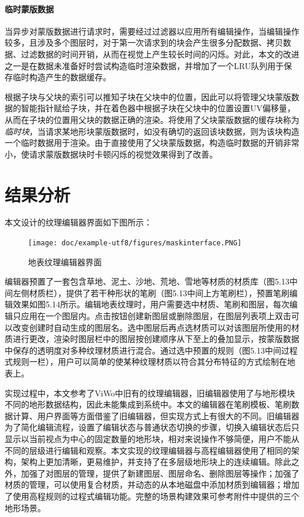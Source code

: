 \paragraph{临时蒙版数据}
当异步对蒙版数据进行请求时，需要经过过滤器以应用所有编辑操作，当编辑操作较多，且涉及多个图层时，对于第一次请求到的块会产生很多分配数据、拷贝数据、过滤数据的时间开销，从而在视觉上产生较长时间的闪烁。对此，本文的改进之一是在数据未准备好时尝试构造临时渲染数据，并增加了一个LRU队列用于保存临时构造产生的数据缓存。\par
根据子块与父块的索引可以推知子块在父块中的位置，因此可以将管理父块蒙版数据的智能指针赋给子块，并在着色器中根据子块在父块中的位置设置UV偏移量，从而在子块的位置用父块的数据正确的渲染。将使用了父块蒙版数据的缓存块称为\textit{临时块}，当请求某地形块蒙版数据时，如没有确切的返回该块数据，则为该块构造一个临时数据用于渲染。由于直接使用了父块蒙版数据，构造临时数据的开销非常小，使请求蒙版数据块时卡顿闪烁的视觉效果得到了改善。

\section{结果分析}
本文设计的纹理编辑器界面如下图所示：\par
\begin{figure}[htb]
    \centering
    \texttt{[image: doc/example-utf8/figures/maskinterface.PNG]}
  \caption{地表纹理编辑器界面}
  \end{figure}
编辑器预置了一套包含草地、泥土、沙地、荒地、雪地等材质的材质库（图5.13中间左侧材质栏），提供了若干种形状的笔刷（图5.13中间上方笔刷栏），预置笔刷编辑效果如图5.14所示。编辑地表纹理时，用户需要选中材质、笔刷和图层，每次编辑只应用在一个图层内。点击按钮创建新图层或删除图层，在图层列表项上双击可以改变创建时自动生成的图层名。选中图层后再点选材质可以对该图层所使用的材质进行更改，渲染时图层栏中的图层按创建顺序从下至上的叠加显示，按蒙版数据中保存的透明度对多种纹理材质进行混合。通过选中预置的规则（图5.13中间过程式规则一栏），用户可以简单的使某种纹理材质以符合其分布特征的方式绘制在地表上。\par
实现过程中，本文参考了ViWo中旧有的纹理编辑器，旧编辑器使用了与地形模块不同的地形数据结构，因此未能集成到系统中。本文的编辑器在笔刷模板、笔刷数据计算、用户界面等方面借鉴了旧编辑器，但实现方式上有很大的不同。旧编辑器为了简化编辑流程，设置了编辑状态与普通状态切换的步骤，切换入编辑状态后只显示以当前视点为中心的固定数量的地形块，相对来说操作不够简便，用户不能从不同的层级进行编辑和观察。本文实现的纹理编辑器与高程编辑器使用了相同的架构，架构上更加清晰，更易维护，并支持了在多层级地形块上的连续编辑。除此之外，加强了对图层的管理，提供了新建图层、图层命名、删除图层等操作；加强了材质的管理，可以使用复合材质，并动态的从本地磁盘中添加材质到编辑器；增加了使用高程规则的过程式编辑功能。完整的场景构建效果可参考附件中提供的三个地形场景。\par

